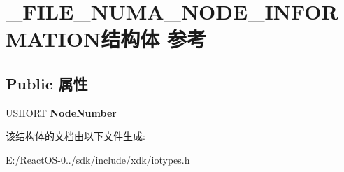 \hypertarget{struct___f_i_l_e___n_u_m_a___n_o_d_e___i_n_f_o_r_m_a_t_i_o_n}{}\section{\+\_\+\+F\+I\+L\+E\+\_\+\+N\+U\+M\+A\+\_\+\+N\+O\+D\+E\+\_\+\+I\+N\+F\+O\+R\+M\+A\+T\+I\+O\+N结构体 参考}
\label{struct___f_i_l_e___n_u_m_a___n_o_d_e___i_n_f_o_r_m_a_t_i_o_n}
\subsection*{Public 属性}
\begin{DoxyCompactItemize}
\item 
\mbox{\label{struct___f_i_l_e___n_u_m_a___n_o_d_e___i_n_f_o_r_m_a_t_i_o_n_a319c0cc2d819aec79f4097cb00e8ab65}} 
U\+S\+H\+O\+RT {\bfseries Node\+Number}
\end{DoxyCompactItemize}


该结构体的文档由以下文件生成\+:\begin{DoxyCompactItemize}
\item 
E\+:/\+React\+O\+S-\/0../sdk/include/xdk/iotypes.\+h\end{DoxyCompactItemize}
